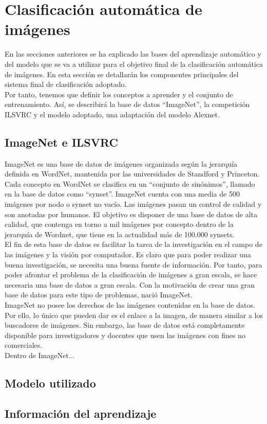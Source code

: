 \section{Clasificación automática de imágenes}

En las secciones anteriores se ha explicado las bases del aprendizaje automático y del modelo que se va a utilizar para el objetivo final de la clasificación automática de imágenes. En esta sección se detallarán los componentes principales del sistema final de clasificación adoptado.\\

Por tanto, tenemos que definir los conceptos a aprender y el conjunto de entrenamiento. Así, se describirá la base de datos ``ImageNet'', la competición ILSVRC y el modelo adoptado, una adaptación del modelo Alexnet.\\

\subsection{ImageNet e ILSVRC}

ImageNet es una base de datos de imágenes organizada según la jerarquía definida en WordNet, mantenida por las universidades de Standford y Princeton. Cada concepto en WordNet se clasifica en un ``conjunto de sinónimos'', llamado en la base de datos como ``synset''.  ImageNet cuenta con una media de 500 imágenes por nodo o synset no vacío. Las imágenes pasan un control de calidad y son anotadas por humanos. El objetivo es disponer de una base de datos de alta calidad, que contenga en torno a mil imágenes por concepto dentro de la jerarquía de Wordnet, que tiene en la actualidad más de 100.000 synsets.\\

El fin de esta base de datos es facilitar la tarea de la investigación en el campo de las imágenes y la visión por computador. Es claro que para poder realizar una buena investigación, se necesita una buena fuente de información. Por tanto, para poder afrontar el problema de la clasificación de imágenes a gran escala, se hace necesaria una base de datos a gran escala. Con la motivación de crear una gran base de datos para este tipo de problemas, nació ImageNet.\\

ImageNet no posee los derechos de las imágenes contenidas en la base de datos. Por ello, lo único que pueden dar es el enlace a la imagen, de manera similar a los buscadores de imágenes. Sin embargo, las base de datos está completamente disponible para investigadores y docentes que usen las imágenes con fines no comerciales.\\

Dentro de ImageNet...\\

\subsection{Modelo utilizado}

\subsection{Información del aprendizaje}

